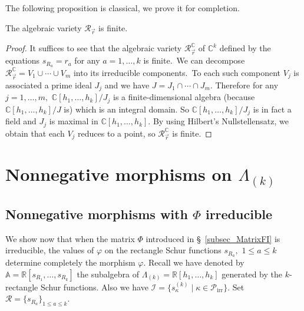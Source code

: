 \documentclass[ALCO,ThmDefs,Unicode,epreuves]{cedram}
\DeclareMathOperator{\irr}{irr}
\begin{document}
The following proposition is classical, we prove it for completion.

\begin{prop}
\label{Prop_Variety}The algebraic variety $\mathcal{R}_{\vec{r}}$ is finite.
\end{prop}

\begin{proof}
It suffices to see that the algebraic variety $\mathcal{R}_{\vec{r}%
}^{\mathbb{C}}$ of $\mathbb{C}^{k}$ defined by the equations $s_{R_{a}}=r_{a}$
for any $a=1,\ldots,k$ is finite.\ We can decompose $\mathcal{R}_{\vec{r}%
}^{\mathbb{C}}=V_{1}\cup\cdots\cup V_{m}$ into its irreducible components.\ To
each such component $V_{j}$ is associated a prime ideal $J_{j}$ and we have
$J=J_{1}\cap\cdots\cap J_{m}$. Therefore for any $j=1,\ldots,m,$
$\mathbb{C}[h_{1},\ldots,h_{k}]/J_{j}$ is a finite-dimensional algebra
(because $\mathbb{C}[h_{1},\ldots,h_{k}]/J$ is) which is an integral domain.
So $\mathbb{C}[h_{1},\ldots,h_{k}]/J_{j}$ is in fact a field and $J_{j}$ is
maximal in $\mathbb{C}[h_{1},\ldots,h_{k}]$. By using Hilbert's
Nullstellensatz, we obtain that each $V_{j}$ reduces to a point, so
$\mathcal{R}_{\vec{r}}^{\mathbb{C}}$ is finite.
\end{proof}

\section{Nonnegative morphisms on \texorpdfstring{$\Lambda_{(k)}$}{Lambda k}}\label{section5}

\subsection{Nonnegative morphisms with \texorpdfstring{$\Phi$}{Phi} irreducible}

We show now that when the matrix $\Phi$ introduced in
\S~\ref{subsec_MatrixFI} is irreducible, the values of $\varphi$ on the
rectangle Schur functions $s_{R_{a}},$ $1\leq a\leq k$ determine completely
the morphism $\varphi$. Recall we have denoted by $\mathbb{A}=\mathbb{R}%
[s_{R_{1}},\ldots,s_{R_{k}}]$ the subalgebra of $\Lambda_{(k)}=\mathbb{R}%
[h_{1},\ldots,h_{k}]$ generated by the $k$-rectangle Schur functions. Also we
have $\mathcal{I}=\{s_{\kappa}^{(k)}\mid\kappa\in\mathcal{P}_{\irr }%
\}$. Set $\mathcal{R}=\{s_{R_{a}}\}_{1\leq a\leq k}$.
\end{document}
